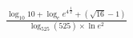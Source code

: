 \documentclass[preview]{standalone}
\begin{document}
\begin{align*}
\frac{\log_{10}{10}+ \log_{e} { e{^4}^{ \frac{1}{2}}} +(\sqrt{ 16 }-1)}   {\log_{525}(525)\times \ln e^{2}}
\end{align*}
\end{document}
